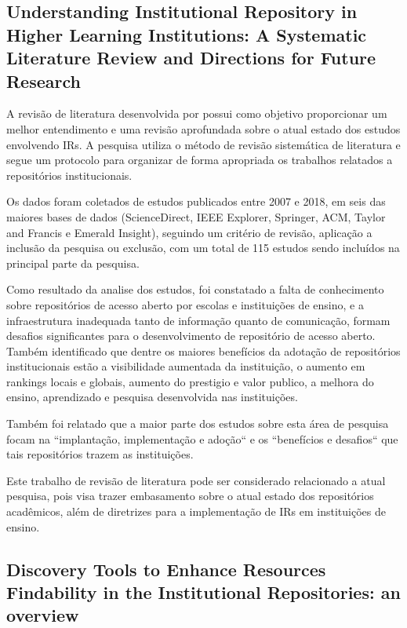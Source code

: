 \subsection{Understanding Institutional Repository in Higher Learning Institutions: A Systematic Literature Review and Directions for Future Research}

A revisão de literatura desenvolvida por \cite{Asadi:2019} possui como objetivo
proporcionar um melhor entendimento e uma revisão aprofundada sobre o atual estado
dos estudos envolvendo IRs. A pesquisa utiliza o método de revisão sistemática
de literatura e segue um protocolo para organizar de forma apropriada os
trabalhos relatados a repositórios institucionais.

Os dados foram coletados de estudos publicados entre 2007 e 2018, em
seis das maiores bases de dados (ScienceDirect, IEEE Explorer, Springer, ACM,
Taylor and Francis e Emerald Insight), seguindo um critério de revisão, aplicação
a inclusão da pesquisa ou exclusão, com um total de 115 estudos sendo
incluídos na principal parte da pesquisa.

Como resultado da analise dos estudos, foi constatado a falta de conhecimento
sobre repositórios de acesso aberto por escolas e instituições de ensino, e
a infraestrutura inadequada tanto de informação quanto de comunicação, formam
desafios significantes para o desenvolvimento de repositório de acesso aberto.
Também identificado que dentre os maiores benefícios da adotação de repositórios
institucionais estão a visibilidade aumentada da instituição, o aumento em
rankings locais e globais, aumento do prestigio e valor publico, a melhora do
ensino, aprendizado e pesquisa desenvolvida nas instituições.

Também foi relatado que a maior parte dos estudos sobre esta área de pesquisa
focam na ``implantação, implementação e adoção`` e os ``benefícios e desafios``
que tais repositórios trazem as instituições.

Este trabalho de revisão de literatura pode ser considerado relacionado
a atual pesquisa, pois visa trazer embasamento sobre o atual estado
dos repositórios acadêmicos, além de diretrizes para a implementação
de IRs em instituições de ensino.

\subsection{Discovery Tools to Enhance Resources Findability in the Institutional Repositories: an overview}

